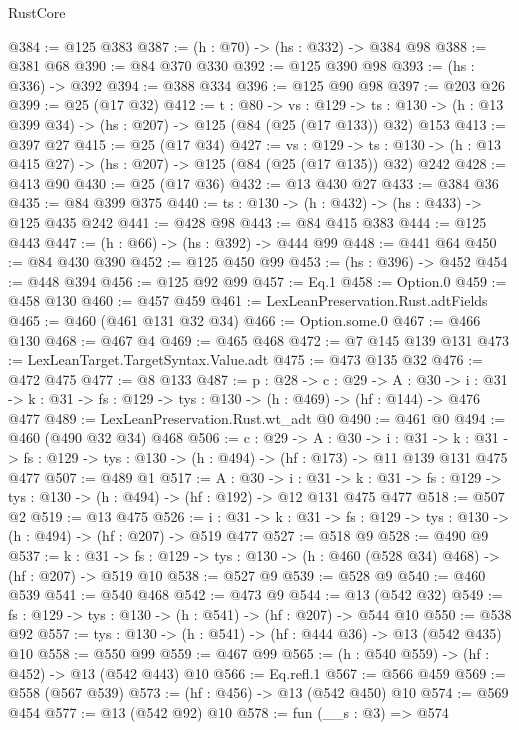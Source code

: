 \begin{lexlean}{RustCore}
\begin{coremodule}
@384 := @125 @383
@387 := (h : @70) -> (hs : @332) -> @384 @98
@388 := @381 @68
@390 := @84 @370 @330
@392 := @125 @390 @98
@393 := (hs : @336) -> @392
@394 := @388 @334
@396 := @125 @90 @98
@397 := @203 @26
@399 := @25 (@17 @32)
@412 := {t : @80} ->
  {vs : @129} ->
  {ts : @130} -> (h : @13 @399 @34) -> (hs : @207) -> @125 (@84 (@25 (@17 @133)) @32) @153
@413 := @397 @27
@415 := @25 (@17 @34)
@427 := {vs : @129} ->
  {ts : @130} -> (h : @13 @415 @27) -> (hs : @207) -> @125 (@84 (@25 (@17 @135)) @32) @242
@428 := @413 @90
@430 := @25 (@17 @36)
@432 := @13 @430 @27
@433 := @384 @36
@435 := @84 @399 @375
@440 := {ts : @130} -> (h : @432) -> (hs : @433) -> @125 @435 @242
@441 := @428 @98
@443 := @84 @415 @383
@444 := @125 @443
@447 := (h : @66) -> (hs : @392) -> @444 @99
@448 := @441 @64
@450 := @84 @430 @390
@452 := @125 @450 @99
@453 := (hs : @396) -> @452
@454 := @448 @394
@456 := @125 @92 @99
@457 := Eq.{1}
@458 := Option.{0}
@459 := @458 @130
@460 := @457 @459
@461 := LexLeanPreservation.Rust.adtFields
@465 := @460 (@461 @131 @32 @34)
@466 := Option.some.{0}
@467 := @466 @130
@468 := @467 @4
@469 := @465 @468
@472 := @7 @145 @139 @131
@473 := LexLeanTarget.TargetSyntax.Value.adt
@475 := @473 @135 @32
@476 := @472 @475
@477 := @8 @133
@487 := {p : @28} ->
  {c : @29} ->
  {A : @30} ->
  {i : @31} -> {k : @31} -> {fs : @129} -> {tys : @130} -> (h : @469) -> (hf : @144) -> @476 @477
@489 := LexLeanPreservation.Rust.wt_adt @0
@490 := @461 @0
@494 := @460 (@490 @32 @34) @468
@506 := {c : @29} ->
  {A : @30} ->
  {i : @31} ->
  {k : @31} -> {fs : @129} -> {tys : @130} -> (h : @494) -> (hf : @173) -> @11 @139 @131 @475 @477
@507 := @489 @1
@517 := {A : @30} ->
  {i : @31} ->
  {k : @31} -> {fs : @129} -> {tys : @130} -> (h : @494) -> (hf : @192) -> @12 @131 @475 @477
@518 := @507 @2
@519 := @13 @475
@526 := {i : @31} ->
  {k : @31} -> {fs : @129} -> {tys : @130} -> (h : @494) -> (hf : @207) -> @519 @477
@527 := @518 @9
@528 := @490 @9
@537 := {k : @31} ->
  {fs : @129} -> {tys : @130} -> (h : @460 (@528 @34) @468) -> (hf : @207) -> @519 @10
@538 := @527 @9
@539 := @528 @9
@540 := @460 @539
@541 := @540 @468
@542 := @473 @9
@544 := @13 (@542 @32)
@549 := {fs : @129} -> {tys : @130} -> (h : @541) -> (hf : @207) -> @544 @10
@550 := @538 @92
@557 := {tys : @130} -> (h : @541) -> (hf : @444 @36) -> @13 (@542 @435) @10
@558 := @550 @99
@559 := @467 @99
@565 := (h : @540 @559) -> (hf : @452) -> @13 (@542 @443) @10
@566 := Eq.refl.{1}
@567 := @566 @459
@569 := @558 (@567 @539)
@573 := (hf : @456) -> @13 (@542 @450) @10
@574 := @569 @454
@577 := @13 (@542 @92) @10
@578 := fun (__s : @3) => @574

\end{coremodule}
\end{lexlean}
